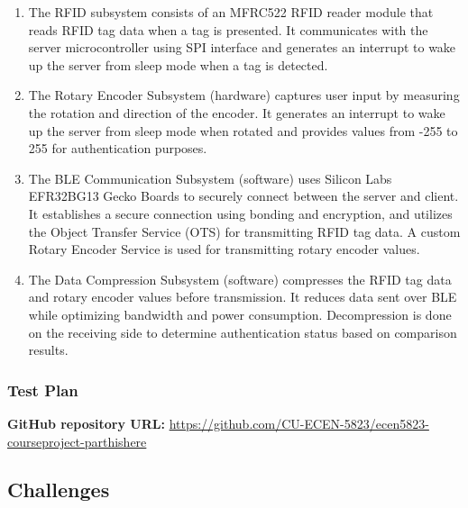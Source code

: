 \documentclass[a4paper,11pt]{article}%
\begin{document}
\begin{enumerate}
    \item The RFID subsystem consists of an MFRC522 RFID reader module that reads RFID tag data when a tag is presented. It communicates with the server microcontroller using SPI interface and generates an interrupt to wake up the server from sleep mode when a tag is detected.

    \item The Rotary Encoder Subsystem (hardware) captures user input by measuring the rotation and direction of the encoder. It generates an interrupt to wake up the server from sleep mode when rotated and provides values from -255 to 255 for authentication purposes.

    \item The BLE Communication Subsystem (software) uses Silicon Labs EFR32BG13 Gecko Boards to securely connect between the server and client. It establishes a secure connection using bonding and encryption, and utilizes the Object Transfer Service (OTS) for transmitting RFID tag data. A custom Rotary Encoder Service is used for transmitting rotary encoder values.

    \item The Data Compression Subsystem (software) compresses the RFID tag data and rotary encoder values before transmission. It reduces data sent over BLE while optimizing bandwidth and power consumption. Decompression is done on the receiving side to determine authentication status based on comparison results.
\end{enumerate}



\subsubsection{Test Plan}




\textbf{GitHub repository URL:} \href{https://github.com/CU-ECEN-5823/ecen5823-courseproject-parthishere}{https://github.com/CU-ECEN-5823/ecen5823-courseproject-parthishere}



\subsection{Challenges}
\end{document}

